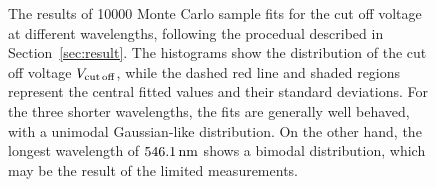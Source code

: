 \documentclass[aps,twocolumn,secnumarabic,balancelastpage,amsmath,amssymb,nofootinbib,floatfix]{revtex4-1}
\newcommand{\nm}{\,{\rm nm}}
\begin{document}
\begin{figure}
    \caption{The results of 10000 Monte Carlo sample fits for the cut off voltage at different wavelengths, following the procedual described in Section~\ref{sec:result}. The histograms show the distribution of the cut off voltage $V_{\rm{cut\,off}}$, while the dashed red line and shaded regions represent the central fitted values and their standard deviations. For the three shorter wavelengths, the fits are generally well behaved, with a unimodal Gaussian-like distribution. On the other hand, the longest wavelength of $546.1\nm$ shows a bimodal distribution, which may be the result of the limited measurements.}
    \label{fig:MC_fitting}
\end{figure}
\end{document}
